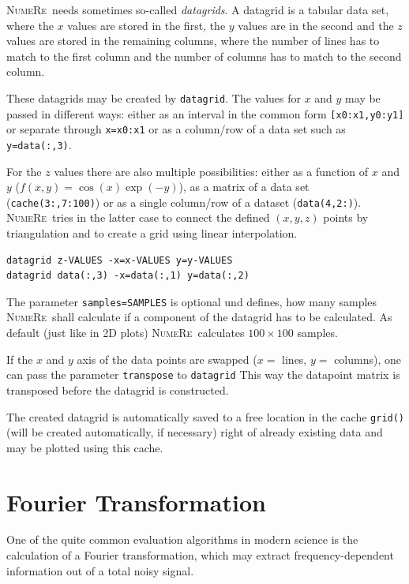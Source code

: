 \documentclass[DIV=14,headsepline,footsepline]{scrbook}
\newcommand{\NR}{\textsc{Nu\-me\-Re}}
\begin{document}
				\NR\ needs sometimes so-called \emph{datagrids}. A datagrid is a tabular data set, where the $x$ values are stored in the first, the $y$ values are in the second and the $z$ values are stored in the remaining columns, where the number of lines has to match to the first column and the number of columns has to match to the second column.
				
				These datagrids may be created by \lstinline+datagrid+. The values for $x$ and $y$ may be passed in different ways: either as an interval in the common form \lstinline+[x0:x1,y0:y1]+ or separate through \lstinline+x=x0:x1+ or as a column/row of a data set such as \lstinline+y=data(:,3)+.
				
				For the $z$ values there are also multiple possibilities: either as a function of $x$ and $y$ ($f(x,y) = \cos(x)\exp(-y)$), as a matrix of a data set (\lstinline+cache(3:,7:100)+) or as a single column/row of a dataset (\lstinline+data(4,2:)+). \NR\ tries in the latter case to connect the defined $(x,y,z)$ points by triangulation and to create a grid using linear interpolation.
				\begin{lstlisting}
datagrid z-VALUES -x=x-VALUES y=y-VALUES
datagrid data(:,3) -x=data(:,1) y=data(:,2)
				\end{lstlisting}
				
				The parameter \lstinline+samples=SAMPLES+ is optional und defines, how many samples \NR\ shall calculate if a component of the datagrid has to be calculated. As default (just like in 2D plots) \NR\ calculates $100\times100$ samples.
				
				If the $x$ and $y$ axis of the data points are swapped ($x =$ lines, $y=$ columns), one can pass the parameter \lstinline+transpose+ to \lstinline+datagrid+ This way the datapoint matrix is transposed before the datagrid is constructed.
	
				The created datagrid is automatically saved to a free location in the cache \lstinline+grid()+ (will be created automatically, if necessary) right of already existing data and may be plotted using this cache.
				
			\section{Fourier Transformation}
				One of the quite common evaluation algorithms in modern science is the calculation of a Fourier transformation, which may extract frequency-dependent information out of a total noisy signal.
				
\end{document}
